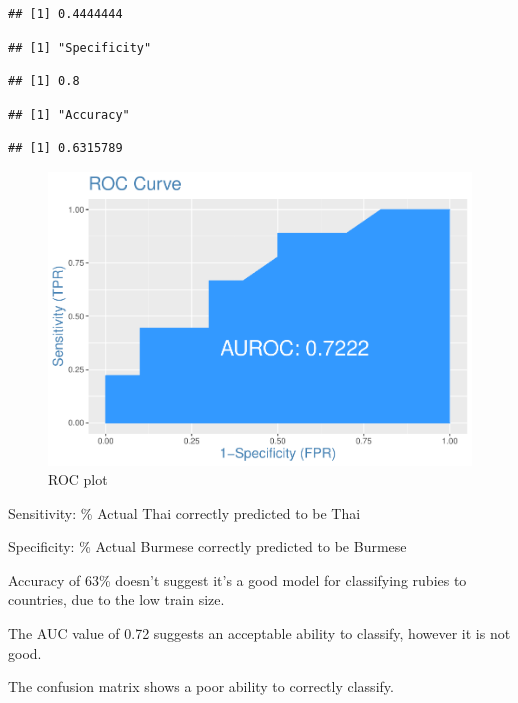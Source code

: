 \documentclass[
  8pt,
]{article}
\begin{document}
\begin{verbatim}
## [1] 0.4444444
\end{verbatim}

\begin{verbatim}
## [1] "Specificity"
\end{verbatim}

\begin{verbatim}
## [1] 0.8
\end{verbatim}

\begin{verbatim}
## [1] "Accuracy"
\end{verbatim}

\begin{verbatim}
## [1] 0.6315789
\end{verbatim}

\begin{figure}

{\centering \includegraphics{Report_files/figure-latex/2.5a-1} 

}

\caption{ROC plot}\label{fig:2.5a}
\end{figure}

Sensitivity: \% Actual Thai correctly predicted to be Thai

Specificity: \% Actual Burmese correctly predicted to be Burmese

Accuracy of 63\% doesn't suggest it's a good model for classifying
rubies to countries, due to the low train size.

The AUC value of 0.72 suggests an acceptable ability to classify,
however it is not good.

The confusion matrix shows a poor ability to correctly classify.
\end{document}

